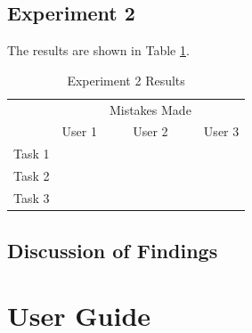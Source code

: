 \documentclass[10pt,a4paper]{article}
\begin{document}
\subsection*{Experiment 2}

The results are shown in Table \ref{table:experiment-2}.

\begin{table}[H]
\centering
\begin{tabular}{c|ccc|}
\cline{2-4}
                             &                             & Mistakes Made               &        \\ \cline{2-4} 
                             & \multicolumn{1}{c|}{User 1} & \multicolumn{1}{c|}{User 2} & User 3 \\ \hline
\multicolumn{1}{|c|}{Task 1} & \multicolumn{1}{c|}{}       & \multicolumn{1}{c|}{}       &        \\ \hline
\multicolumn{1}{|c|}{Task 2} & \multicolumn{1}{c|}{}       & \multicolumn{1}{c|}{}       &        \\ \hline
\multicolumn{1}{|c|}{Task 3} & \multicolumn{1}{c|}{}       & \multicolumn{1}{c|}{}       &        \\ \hline
\end{tabular}
\caption{Experiment 2 Results \label{table:experiment-2}}
\end{table}

\subsection*{Discussion of Findings}

\section*{User Guide}
\end{document}
